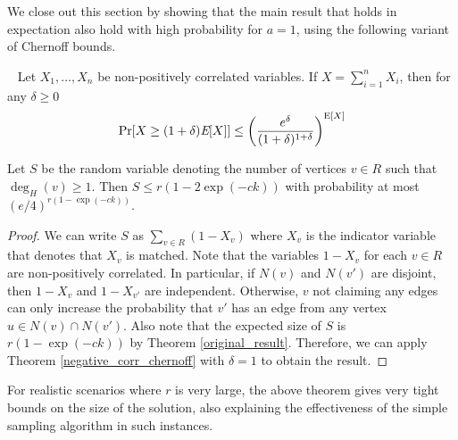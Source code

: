 We close out this section by showing that the main result that holds
in expectation also hold with high probability for $a=1$, using the
following variant of Chernoff bounds.

\begin{thm}\label{negative_corr_chernoff}~\cite{AugerDoerr2011}
Let $X_1,\ldots, X_n$ be non-positively correlated variables. If $X=\sum_{i=1}^n X_i$, then for any $\delta\geq 0$
\[ \Pr[X \geq (1+\delta)\emph{\text{E}}[X] ] \leq \left(\frac{e^\delta}{(1+\delta)^{1+\delta}}\right)^{\text{E}[X]} \]
\end{thm}


\begin{thm}
Let $S$ be the random variable denoting the number of vertices $v \in R$ such that $\deg_{H}(v)\geq 1$. Then
$ S \leq r(1-2\exp(-ck))$ with probability at most $(e/4)^{r(1-\exp(-ck))}$.
\end{thm}

\begin{proof}
We can write $S$ as $\sum_{v\in R} (1-X_v)$ where $X_v$ is the indicator
variable that denotes that $X_v$ is matched. Note that the variables
$1-X_v$ for each $v\in R$ are non-positively correlated. In
particular, if $N(v)$ and $N(v')$ are disjoint, then $1-X_v$ and
$1-X_{v'}$ are independent. Otherwise, $v$ not claiming any edges can
only increase the probability that $v'$ has an edge from any vertex
$u\in N(v)\cap N(v')$. Also note that the expected size of $S$ is
$r(1-\exp(-ck))$ by Theorem \ref{original_result}. Therefore, we can
apply Theorem \ref{negative_corr_chernoff} with $\delta=1$ to obtain
the result.
\end{proof}

For realistic scenarios where $r$ is very large, the above theorem gives very tight bounds on the size of the solution, also explaining the effectiveness of the simple sampling algorithm in such instances.
